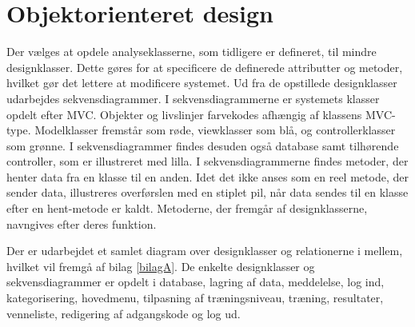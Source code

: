 \section{Objektorienteret design}
Der vælges at opdele analyseklasserne, som tidligere er defineret, til mindre designklasser. Dette gøres for at specificere de definerede attributter og metoder, hvilket gør det lettere at modificere systemet. Ud fra de opstillede designklasser udarbejdes sekvensdiagrammer. I sekvensdiagrammerne er systemets klasser opdelt efter MVC. Objekter og livslinjer farvekodes afhængig af klassens MVC-type. Modelklasser fremstår som røde, viewklasser som blå, og controllerklasser som grønne. I sekvensdiagrammer findes desuden også database samt tilhørende controller, som er illustreret med lilla. I sekvensdiagrammerne findes metoder, der henter data fra en klasse til en anden. Idet det ikke anses som en reel metode, der sender data, illustreres overførslen med en stiplet pil, når data sendes til en klasse efter en hent-metode er kaldt. Metoderne, der fremgår af designklasserne, navngives efter deres funktion.

Der er udarbejdet et samlet diagram over designklasser og relationerne i mellem, hvilket vil fremgå af bilag \ref{bilagA}. De enkelte designklasser og sekvensdiagrammer er opdelt i database, lagring af data, meddelelse, log ind, kategorisering, hovedmenu, tilpasning af træningsniveau, træning, resultater, venneliste, redigering af adgangskode og log ud. 
